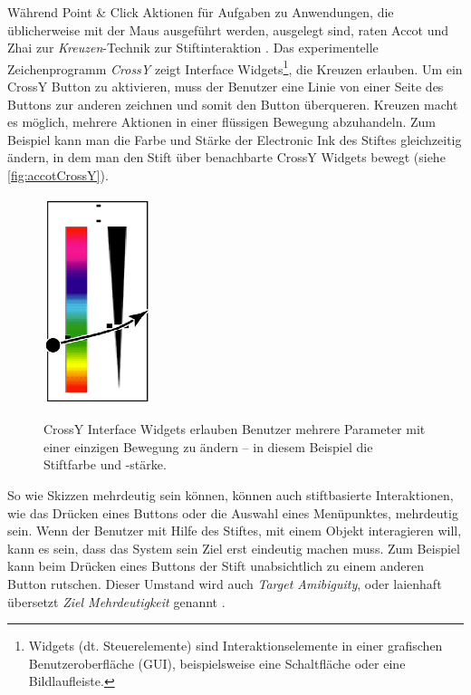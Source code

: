 \medskip Während Point \& Click Aktionen für Aufgaben zu Anwendungen, die üblicherweise mit der Maus ausgeführt werden, ausgelegt sind, raten Accot und Zhai zur \emph{Kreuzen}-Technik zur Stiftinteraktion \citep{Accot:2002}. Das experimentelle Zeichenprogramm \emph{CrossY} \citep{Apitz:2004} zeigt Interface Widgets\footnote{Widgets (dt. Steuerelemente) sind Interaktionselemente in einer grafischen Benutzeroberfläche (\ac{GUI}), beispielsweise eine Schaltfläche oder eine Bildlaufleiste.}, die Kreuzen erlauben. Um ein CrossY Button zu aktivieren, muss der Benutzer eine Linie von einer Seite des Buttons zur anderen zeichnen und somit den Button überqueren. Kreuzen macht es möglich, mehrere Aktionen in einer flüssigen Bewegung abzuhandeln. Zum Beispiel kann man die Farbe und Stärke der Electronic Ink des Stiftes gleichzeitig ändern, in dem man den Stift über benachbarte CrossY Widgets bewegt (siehe \autoref{fig:accotCrossY}).

\begin{figure}[bth]
	\begin{center}
	
	{\includegraphics[width=0.28\linewidth]{gfx/accotCrossY}}
	\caption[CrossY \newline \citep{Johnson:2009}]{CrossY Interface Widgets erlauben Benutzer mehrere Parameter mit einer einzigen Bewegung zu ändern -- in diesem Beispiel die Stiftfarbe und -stärke.}
	\label{fig:accotCrossY}
	\end{center}
\end{figure}

\medskip So wie Skizzen mehrdeutig sein können, können auch stiftbasierte Interaktionen, wie das Drücken eines Buttons oder die Auswahl eines Menüpunktes, mehrdeutig sein. Wenn der Benutzer mit Hilfe des Stiftes, mit einem Objekt interagieren will, kann es sein, dass das System sein Ziel erst eindeutig machen muss. Zum Beispiel kann beim Drücken eines Buttons der Stift unabsichtlich zu einem anderen Button rutschen. Dieser Umstand wird auch \emph{Target Amibiguity}, oder laienhaft übersetzt \emph{Ziel Mehrdeutigkeit} genannt \citep{Mankoff:2000p77,Mankoff:2000}.

